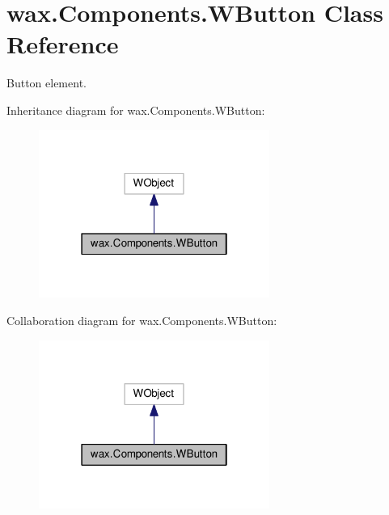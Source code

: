 \hypertarget{classwax_1_1Components_1_1WButton}{}\section{wax.\+Components.\+W\+Button Class Reference}
\label{classwax_1_1Components_1_1WButton}


Button element.  




Inheritance diagram for wax.\+Components.\+W\+Button\+:\nopagebreak
\begin{figure}[H]
\begin{center}
\leavevmode
\includegraphics[width=214pt]{classwax_1_1Components_1_1WButton__inherit__graph}
\end{center}
\end{figure}


Collaboration diagram for wax.\+Components.\+W\+Button\+:\nopagebreak
\begin{figure}[H]
\begin{center}
\leavevmode
\includegraphics[width=214pt]{classwax_1_1Components_1_1WButton__coll__graph}
\end{center}
\end{figure}
